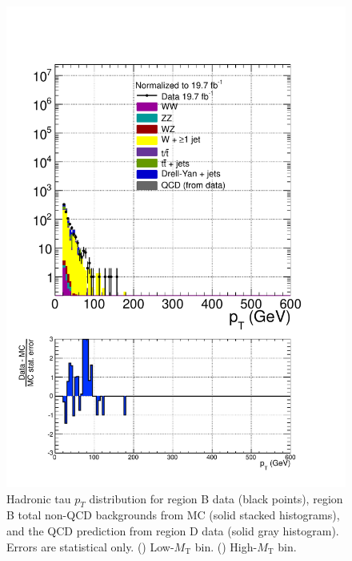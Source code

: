 \begin{figure}[hbtp]
\begin{center}
    \includegraphics[width=\cmsFigWidth]{figures/dataVsMCQCD_tauHadPT_highMT_v87}
   \caption{Hadronic tau $p_T$ distribution for region B data (black points), region B total non-QCD backgrounds from MC (solid stacked histograms), and the QCD prediction from region D data (solid gray histogram).  Errors are statistical only. (\cmsLeft) Low-$M_{\text{T}}$ bin. (\cmsRight) High-$M_{\text{T}}$ bin.}
    \label{fig:regB-data-MC-tauHadPT}
  \end{center}
\end{figure}

